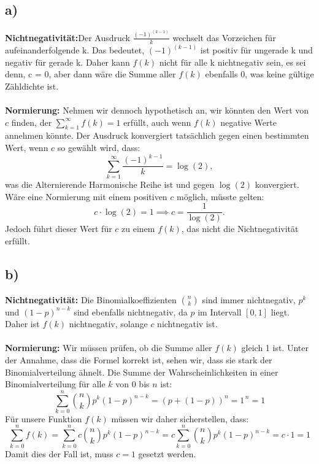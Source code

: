 \documentclass[a4paper]{scrartcl}
\begin{document}
\subsection*{a)}
\textbf{Nichtnegativität:}Der Ausdruck $\frac{(-1)^(k-1)}{k}$ wechselt das Vorzeichen für aufeinanderfolgende k. Das bedeutet, $(-1)^(k-1)$ ist positiv für ungerade k und negativ für gerade k.
Daher kann $f(k)$ nicht für alle k nichtnegativ sein, es sei denn, c = 0, aber dann wäre die Summe aller $f(k)$ ebenfalls 0, was keine gültige Zähldichte ist. 
\\\\
\textbf{Normierung:} Nehmen wir dennoch hypothetisch an, wir könnten den Wert von \( c \) finden, der \( \sum_{k=1}^\infty f(k) = 1 \) erfüllt, auch wenn \( f(k) \) negative Werte annehmen könnte. Der Ausdruck konvergiert tatsächlich gegen einen bestimmten Wert, wenn \( c \) so gewählt wird, dass:
\[
\sum_{k=1}^\infty \frac{(-1)^{k-1}}{k} = \log(2),
\]
was die Alternierende Harmonische Reihe ist und gegen \( \log(2) \) konvergiert. Wäre eine Normierung mit einem positiven \( c \) möglich, müsste gelten:
\[
c \cdot \log(2) = 1 \implies c = \frac{1}{\log(2)}.
\]
Jedoch führt dieser Wert für \( c \) zu einem \( f(k) \), das nicht die Nichtnegativität erfüllt.

\subsection*{b)}
\textbf{Nichtnegativität: } Die Binomialkoeffizienten \(\binom{n}{k}\) sind immer nichtnegativ, \(p^k\) und \((1-p)^{n-k}\) sind ebenfalls nichtnegativ, da \(p\) im Intervall \([0, 1]\) liegt. Daher ist \(f(k)\) nichtnegativ, solange \(c\) nichtnegativ ist.
\\\\
\textbf{Normierung: } Wir müssen prüfen, ob die Summe aller \(f(k)\) gleich 1 ist. Unter der Annahme, dass die Formel korrekt ist, sehen wir, dass sie stark der Binomialverteilung ähnelt. Die Summe der Wahrscheinlichkeiten in einer Binomialverteilung für alle \(k\) von 0 bis \(n\) ist:
\[
\sum_{k=0}^n \binom{n}{k} p^k (1-p)^{n-k} = (p + (1-p))^n = 1^{\,n} = 1
\]
Für unsere Funktion \(f(k)\) müssen wir daher sicherstellen, dass:
\[
\sum_{k=0}^n f(k) = \sum_{k=0}^n c \binom{n}{k} p^k (1-p)^{n-k} = c \sum_{k=0}^n \binom{n}{k} p^k (1-p)^{n-k} = c \cdot 1 = 1
\]
Damit dies der Fall ist, muss \(c = 1\) gesetzt werden.
\end{document}
